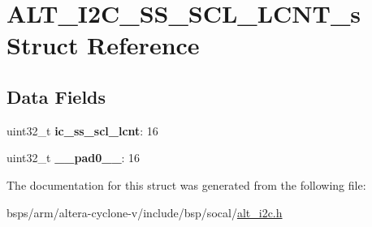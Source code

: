 \hypertarget{structALT__I2C__SS__SCL__LCNT__s}{}\section{A\+L\+T\+\_\+\+I2\+C\+\_\+\+S\+S\+\_\+\+S\+C\+L\+\_\+\+L\+C\+N\+T\+\_\+s Struct Reference}
\label{structALT__I2C__SS__SCL__LCNT__s}
\subsection*{Data Fields}
\begin{DoxyCompactItemize}
\item 
\mbox{\label{structALT__I2C__SS__SCL__LCNT__s_a1e65e4a085038cdde8c1a051de537b0e}} 
uint32\+\_\+t {\bfseries ic\+\_\+ss\+\_\+scl\+\_\+lcnt}\+: 16
\item 
\mbox{\label{structALT__I2C__SS__SCL__LCNT__s_a9e1eb7aa3123cd2092d2a97525c15e76}} 
uint32\+\_\+t {\bfseries \+\_\+\+\_\+pad0\+\_\+\+\_\+}\+: 16
\end{DoxyCompactItemize}


The documentation for this struct was generated from the following file\+:\begin{DoxyCompactItemize}
\item 
bsps/arm/altera-\/cyclone-\/v/include/bsp/socal/\mbox{\hyperlink{socal_2alt__i2c_8h}{alt\+\_\+i2c.\+h}}\end{DoxyCompactItemize}
